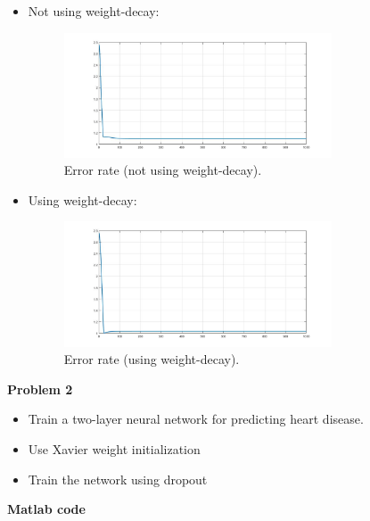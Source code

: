 \documentclass[12pt]{article}
\begin{document}
    \begin{itemize}
        \item Not using weight-decay:
        
        \begin{figure}[H]
        \begin{center}
          \caption{Error rate (not using weight-decay).}
          \includegraphics[width=0.75\textwidth]{images/1-1.jpg}
         \end{center}
        \end{figure}
        
        \item Using weight-decay:
        
        \begin{figure}[H]
        \begin{center}
          \caption{Error rate (using weight-decay).}
          \includegraphics[width=0.75\textwidth]{images/1-2.jpg}
         \end{center}
        \end{figure}
        
    \end{itemize}
\textbf{Problem 2}
\begin{itemize}
    \item Train a two-layer neural network for predicting heart disease.
    \item Use Xavier weight initialization
    \item Train the network using dropout
\end{itemize}    
\textbf{Matlab code}
\end{document}
